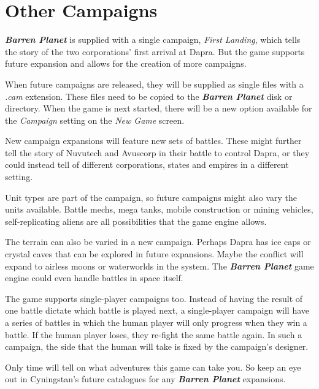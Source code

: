 %
%
%
%

\chapter{Other Campaigns}

\noindent
{\bf \it Barren Planet} is supplied with a single campaign, {\it First Landing}, which tells the story of the two corporations' first arrival at Dapra. But the game supports future expansion and allows for the creation of more campaigns.

When future campaigns are released, they will be supplied as single files with a {\it .cam} extension. These files need to be copied to the {\bf \it Barren Planet} disk or directory. When the game is next started, there will be a new option available for the {\it Campaign} setting on the {\it New Game} screen.

New campaign expansions will feature new sets of battles. These might further tell the story of Nuvutech and Avuscorp in their battle to control Dapra, or they could instead tell of different corporations, states and empires in a different setting.

Unit types are part of the campaign, so future campaigns might also vary the units available. Battle mechs, mega tanks, mobile construction or mining vehicles, self-replicating aliens are all possibilities that the game engine allows.

The terrain can also be varied in a new campaign. Perhaps Dapra has ice caps or crystal caves that can be explored in future expansions. Maybe the conflict will expand to airless moons or waterworlds in the system. The {\bf \it Barren Planet} game engine could even handle battles in space itself.

The game supports single-player campaigns too. Instead of having the result of one battle dictate which battle is played next, a single-player campaign will have a series of battles in which the human player will only progress when they win a battle. If the human player loses, they re-fight the same battle again. In such a campaign, the side that the human will take is fixed by the campaign's designer.

Only time will tell on what adventures this game can take you. So keep an eye out in Cyningstan's future catalogues for any {\bf \it Barren Planet} expansions.
